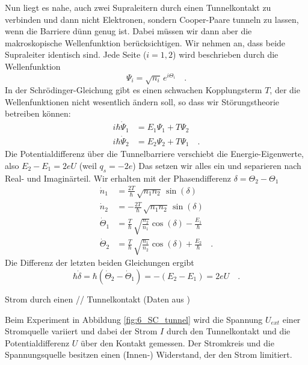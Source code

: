 Nun liegt es nahe, auch zwei Supraleitern durch einen Tunnelkontakt zu verbinden und dann nicht Elektronen, sondern Cooper-Paare tunneln zu lassen, wenn die Barriere dünn genug ist. Dabei müssen wir dann aber die makroskopische Wellenfunktion berücksichtigen. Wir nehmen an, dass beide Supraleiter identisch sind. Jede Seite ($i=1, 2$) wird beschrieben durch die Wellenfunktion 
\begin{equation}
  \Psi_i = \sqrt{n_i} \, e^{i \Theta_i} \quad .
\end{equation}
In der Schrödinger-Gleichung gibt es einen schwachen Kopplungsterm $T$, der die Wellenfunktionen nicht wesentlich ändern soll, so dass wir Störungstheorie betreiben können:
\begin{align}
    i \hbar \dot{\Psi}_1 & =  E_1 \Psi_1 + T \Psi_2 \\ 
    i \hbar \dot{\Psi}_2 & =  E_2 \Psi_2 + T \Psi_1 \quad .
\end{align}
Die Potentialdifferenz über die Tunnelbarriere verschiebt die Energie-Eigenwerte, also $E_2 - E_1 = 2 e U$ (weil $q_s = -2 e$) Das setzen wir alles ein und separieren nach Real- und Imaginärteil. Wir erhalten mit der Phasendifferenz $\delta = \Theta_2 - \Theta_1$
\begin{align}
    \dot{n}_1 & = \frac{2 T}{\hbar} \, \sqrt{n_1 n_2} \,  \sin(\delta) \\
    \dot{n}_2 & = -\frac{2 T}{\hbar} \, \sqrt{n_1 n_2} \,  \sin(\delta) \\
    \dot{\Theta}_1 &= \frac{T}{\hbar} \, \sqrt{\frac{n_2}{n_1}} \cos(\delta) - \frac{E_1}{\hbar} \\
    \dot{\Theta}_2 &= \frac{T}{\hbar} \, \sqrt{\frac{n_1}{n_2}} \cos(\delta) + \frac{E_2}{\hbar} \quad .
\end{align} 
Die Differenz der letzten beiden Gleichungen ergibt
\begin{equation}
   \hbar \dot{\delta} =  \hbar ( \dot{\Theta}_2 -  \dot{\Theta}_1 ) = - (E_2 - E_1) = 2eU \quad .
\end{equation}


\begin{marginfigure}
    \caption{Strom durch einen // Tunnelkontakt (Daten aus \cite{Langenberg1966})
    \label{fig:6_SC_tunnel}}
\end{marginfigure}


Beim Experiment in Abbildung \ref{fig:6_SC_tunnel} wird die Spannung $U_{ext}$ einer Stromquelle variiert und dabei der Strom $I$ durch den Tunnelkontakt und die Potentialdifferenz $U$ über den Kontakt gemessen. Der Stromkreis und die Spannungsquelle besitzen einen (Innen-) Widerstand, der den Strom limitiert.

